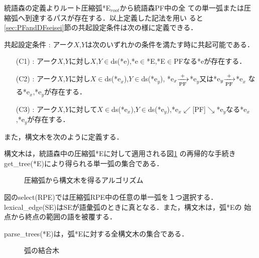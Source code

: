 {\mynoindent}統語森の定義よりルート圧縮弧*E$_{root}$から統語森PF中の全
ての単一弧または圧縮弧へ到達するパスが存在する．以上定義した記法を用い
ると\ref{sec:PFandDFseisei}節の共起設定条件は次の様に定義できる．

\begin{definition}
共起設定条件 : アーク$X$,$Y$は次のいずれかの条件を満たす時に共起可能である．
\begin{itemize}
\item[(C1)] : アーク$X$,$Y$に対し$X$,$Y{\in}$ds(*e),*e${\in}$*E,*E${\in}$PFなる*eが存在する．
\item[(C2)] : アーク$X$,$Y$に対し$X{\in}$ds(*e$_x$),$Y{\in}$ds(*e$_y$),
*e$_x{\xrightarrow[{\rm PF}]{{\tiny +}}}$*e$_y$又は*e$_y{\xrightarrow[{\rm PF}]{{\tiny +}}}$*e$_x$
なる*e$_x$,*e$_y$が存在する．
\item[(C3)] : アーク$X$,$Y$に対して$X{\in}$ds(*e$_x$),$Y{\in}$ds(*e$_y$),*e$_x{\swarrow}${\tiny [PF]}${\searrow}$*e$_y$なる*e$_x$,*e$_y$が存在する．
\end{itemize}
\end{definition}


{\mynoindent}また，構文木を次のように定義する．
\begin{definition}
構文木は，統語森中の圧縮弧*Eに対して適用される図\ref{fig:get_parse_tree} 
の再帰的な手続きget\_tree(*E)により得られる単一弧の集合である．
\end{definition}
\clearpage

    \clearpage
\begin{figure}[t]
 \begin{center}
 \end{center}
\myfiglabelskip
\myfiglabelskippre
\caption{圧縮弧から構文木を得るアルゴリズム}
\myfiglabelskippost
\label{fig:get_parse_tree}
\end{figure}

図のselect(RPE)では圧縮弧RPE中の任意の単一弧を１つ選択する．
lexical\_edge(SE)はSEが語彙弧のときに真となる．また，構文木は，弧*Eの
始点から終点の範囲の語を被覆する．

\begin{definition}
parse\_trees(*E)は，弧*Eに対する全構文木の集合である．
\end{definition}

\begin{figure}[b]
\myfigskiptop
 \begin{center}
 \end{center}
\myfiglabelskip
\myfiglabelskippre
\caption{弧の結合木}
\label{fig:EdgeCombinationTree}
\myfiglabelskippost
\end{figure}


